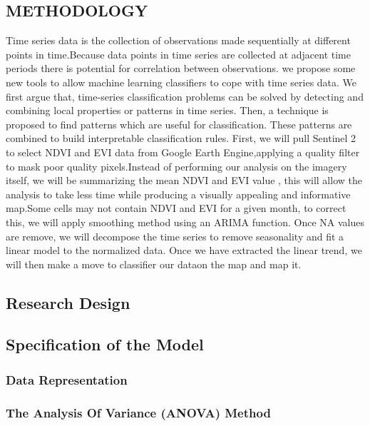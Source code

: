\documentclass[10pt]{report}
\newenvironment{Shaded}{\begin{snugshade}}{\end{snugshade}}
\begin{document}
\begin{flushleft}
		\section{METHODOLOGY}
		Time series data is the collection of observations made sequentially at different points in time.Because data points in time series are collected at adjacent time periods there is potential for correlation between observations. we propose some new tools to allow machine learning classifiers to cope with time series data. We first argue that, time-series classification problems can be solved by detecting and combining local properties or patterns in time series. Then, a technique is proposed to find patterns which are useful for classification. These patterns are combined to build interpretable classification rules.
		First, we will pull Sentinel 2 to select NDVI and EVI data from Google Earth Engine,applying a quality filter to mask poor quality pixels.Instead of performing our analysis on the imagery itself, we will be summarizing the mean NDVI and EVI value , this will allow the analysis to take less time while producing a visually appealing and informative map.Some cells may not contain NDVI and EVI for a given month, to correct this, we will apply smoothing method using an ARIMA function.
		Once NA values are remove, we will decompose the time series to remove seasonality and fit a linear model to the normalized data.
		Once we have extracted the linear trend, we will then make a move to classifier our dataon the map and map it.
		
		\subsection{Research Design}
		\subsection{Specification of the Model}
		\subsubsection{Data Representation}
		\subsubsection{The Analysis Of Variance (ANOVA) Method}

\end{flushleft}
\end{document}
